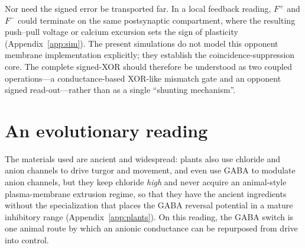 \documentclass[11pt,a4paper]{article}
\begin{document}
Nor need the signed error be transported far. In a local feedback reading, $F^{+}$ and $F^{-}$ could terminate on the same postsynaptic compartment, where the resulting push--pull voltage or calcium excursion sets the sign of plasticity (Appendix~\ref{app:sim}). The present simulations do not model this opponent membrane implementation explicitly; they establish the coincidence-suppression core. The complete signed-XOR should therefore be understood as two coupled operations---a conductance-based XOR-like mismatch gate and an opponent signed read-out---rather than as a single ``shunting mechanism''.

\section{An evolutionary reading}\label{sec:evo}

The materials used are ancient and widespread: plants also use chloride and anion channels to drive turgor and movement, and even use GABA to modulate anion channels, but they keep chloride \emph{high} and never acquire an animal-style plasma-membrane extrusion regime, so that they have the ancient ingredients without the specialization that places the GABA reversal potential in a mature inhibitory range (Appendix~\ref{app:plants}). On this reading, the GABA switch is one animal route by which an anionic conductance can be repurposed from drive into control.
\end{document}
